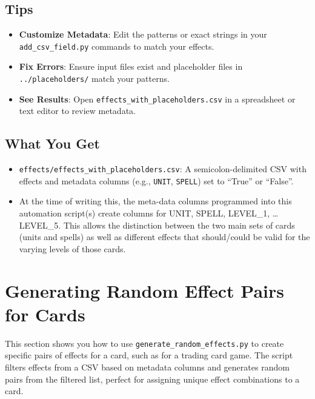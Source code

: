 \subsection{Tips}
\begin{itemize}
	\item \textbf{Customize Metadata}: Edit the patterns or exact strings in your \texttt{add\_csv\_field.py} commands to match your effects.
	\item \textbf{Fix Errors}: Ensure input files exist and placeholder files in \texttt{../placeholders/} match your patterns.
	\item \textbf{See Results}: Open \texttt{effects\_with\_placeholders.csv} in a spreadsheet or text editor to review metadata.
\end{itemize}

\subsection{What You Get}
\begin{itemize}
	\item \texttt{effects/effects\_with\_placeholders.csv}: A semicolon-delimited CSV with effects and metadata columns (e.g., \texttt{UNIT}, \texttt{SPELL}) set to ``True'' or ``False''.
	\item At the time of writing this, the meta-data columns programmed into this automation script(s) create columns for UNIT, SPELL, LEVEL\_1, \dots LEVEL\_5. This allows the distinction between the two main sets of cards (units and spells) as well as different effects that should/could be valid for the varying levels of those cards.
\end{itemize}
















\section{Generating Random Effect Pairs for Cards}

This section shows you how to use \texttt{generate\_random\_effects.py} to create specific pairs of effects for a card, such as for a trading card game. The script filters effects from a CSV based on metadata columns and generates random pairs from the filtered list, perfect for assigning unique effect combinations to a card.

